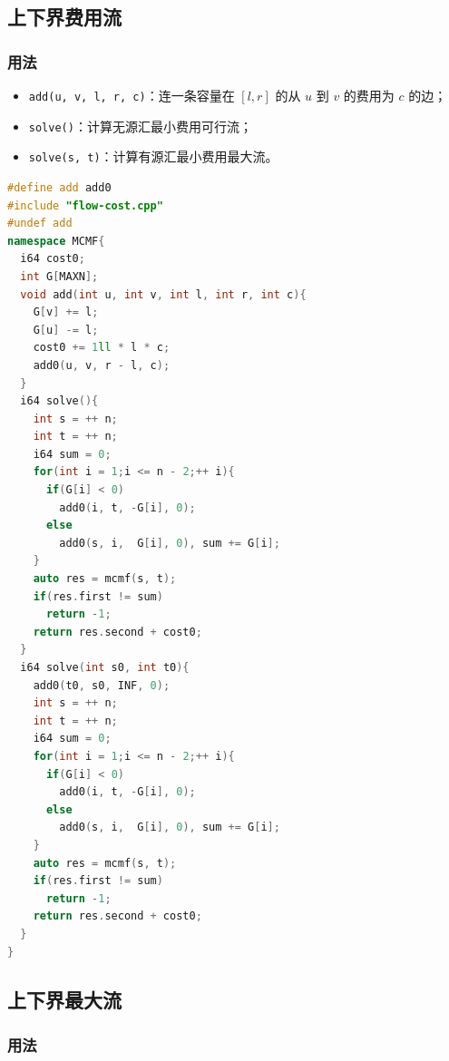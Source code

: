 \documentclass[10pt]{ctexart}
\providecommand{\tightlist}{\setlength{\itemsep}{0pt}\setlength{\parskip}{0pt}}
\newcommand{\passthrough}[1]{#1}
\begin{document}
\begin{multicols}{3}
    \subsection{上下界费用流}\label{ux4e0aux4e0bux754cux8d39ux7528ux6d41}

    \subsubsection{用法}\label{ux7528ux6cd5-2}

    \begin{itemize}
    \tightlist
    \item
      \passthrough{\lstinline!add(u, v, l, r, c)!}：连一条容量在
      \([l, r]\) 的从 \(u\) 到 \(v\) 的费用为 \(c\) 的边；
    \item
      \passthrough{\lstinline!solve()!}：计算无源汇最小费用可行流；
    \item
      \passthrough{\lstinline!solve(s, t)!}：计算有源汇最小费用最大流。
    \end{itemize}

\begin{lstlisting}[language={C++}]
#define add add0
#include "flow-cost.cpp"
#undef add
namespace MCMF{
  i64 cost0;
  int G[MAXN];
  void add(int u, int v, int l, int r, int c){
    G[v] += l;
    G[u] -= l;
    cost0 += 1ll * l * c;
    add0(u, v, r - l, c);
  }
  i64 solve(){
    int s = ++ n;
    int t = ++ n;
    i64 sum = 0;
    for(int i = 1;i <= n - 2;++ i){
      if(G[i] < 0)
        add0(i, t, -G[i], 0);
      else
        add0(s, i,  G[i], 0), sum += G[i];
    }
    auto res = mcmf(s, t);
    if(res.first != sum)
      return -1;
    return res.second + cost0;
  }
  i64 solve(int s0, int t0){
    add0(t0, s0, INF, 0);
    int s = ++ n;
    int t = ++ n;
    i64 sum = 0;
    for(int i = 1;i <= n - 2;++ i){
      if(G[i] < 0)
        add0(i, t, -G[i], 0);
      else
        add0(s, i,  G[i], 0), sum += G[i];
    }
    auto res = mcmf(s, t);
    if(res.first != sum)
      return -1;
    return res.second + cost0;
  }
}
\end{lstlisting}

    \subsection{上下界最大流}\label{ux4e0aux4e0bux754cux6700ux5927ux6d41}

    \subsubsection{用法}\label{ux7528ux6cd5-3}


\end{multicols}
\end{document}
